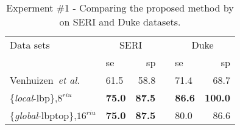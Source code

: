 
\begin{table}[h]
\caption{Experment \#1 - Comparing the proposed method by \cite{Venhuizen2015} on SERI and Duke datasets.}%
\centering
\scriptsize{
\begin{tabular}{l	lr c lr}
\toprule
Data sets 	& \multicolumn{2}{c}{SERI} & & \multicolumn{2}{c}{Duke} \\
  \cmidrule(l){2-3}  \cmidrule(l){5-6}
	         & \ac{se} & \ac{sp} & & \ac{se} & \ac{sp}\\
\midrule
Venhuizen~\textit{et al.} \cite{Venhuizen2015} 		& 61.5 & 58.8 & & 71.4 & 68.7\\
\{\emph{local}-\ac{lbp}\},$8^{riu}$ 				   & \textbf{75.0} & \textbf{87.5} & & \textbf{86.6} & \textbf{100.0}   \\
\{\emph{global}-\ac{lbptop}\},$16^{riu}$				& \textbf{75.0} & \textbf{87.5} & & 80.0 & 86.6  \\


\bottomrule
\end{tabular}}
\label{tab:table1-2}
\end{table}
